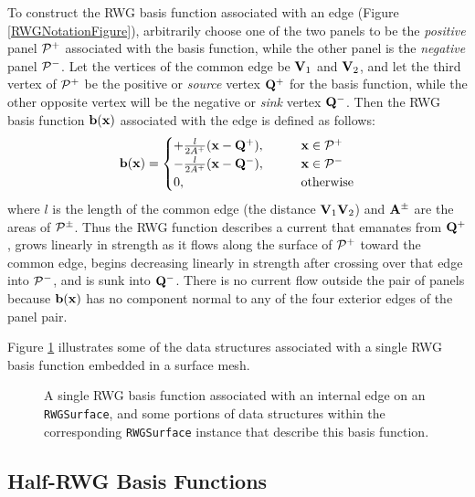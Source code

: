 To construct the RWG basis function associated with an 
edge (Figure \ref{RWGNotationFigure}), arbitrarily choose one 
of the two panels to be the \textit{positive} panel $\mathcal{P}^+$ 
associated with the basis function, while the other panel is the 
\textit{negative} panel $\mathcal{P}^-$. Let the vertices of the 
common edge be $\mathbf{V}_1$ and $\mathbf{V}_2$, and let the third vertex of 
$\mathcal{P}^+$ be the positive or \textit{source} vertex 
$\mathbf{Q}^+$ for the basis function, 
while the other opposite vertex will be the 
negative or \textit{sink} vertex $\mathbf{Q}^-$. Then 
the RWG basis function $\mathbf{b}(\mathbf{x})$ associated with the
edge is defined as follows:
$$ \mathbf{b}(\mathbf{x}) = 
   \begin{cases}   
  +\frac{l}{2A^+}(\mathbf{x} - \mathbf{Q}^+), \qquad &\mathbf{x} \in \mathcal{P}^+ \\ 
  -\frac{l}{2A^+}(\mathbf{x} - \mathbf{Q}^-), \qquad &\mathbf{x} \in \mathcal{P}^- \\ 
   0, \qquad &\text{otherwise}
   \end{cases}
$$
where $l$ is the length of the common edge (the distance
$\mathbf{V}_1 \mathbf{V}_2$) and $\mathbf{A}^\pm$ are the areas of $\mathcal{P}^\pm$.
Thus the RWG function describes a current that emanates 
from $\mathbf{Q}^+$, grows linearly in strength as it flows along
the surface of $\mathcal{P}^+$ toward the common edge, begins
decreasing linearly in strength after crossing over that
edge into $\mathcal{P}^-$, and is sunk into $\mathbf{Q}^-$. There
is no current flow outside the pair of panels because
$\mathbf{b}(\mathbf{x})$ has no component normal to any of the 
four exterior edges of the panel pair.

Figure \ref{RWGBasisFunctionFigure} illustrates some of the 
\lss data structures associated with a single RWG basis function
embedded in a surface mesh.
\begin{figure}
\begin{center}
\caption{A single RWG basis function associated with an internal edge 
         on an \texttt{RWGSurface}, and some portions of data structures 
         within the corresponding \texttt{RWGSurface} instance that 
         describe this basis function.}
\label{RWGBasisFunctionFigure}
\end{center}
\end{figure}

\subsection*{Half-RWG Basis Functions}

